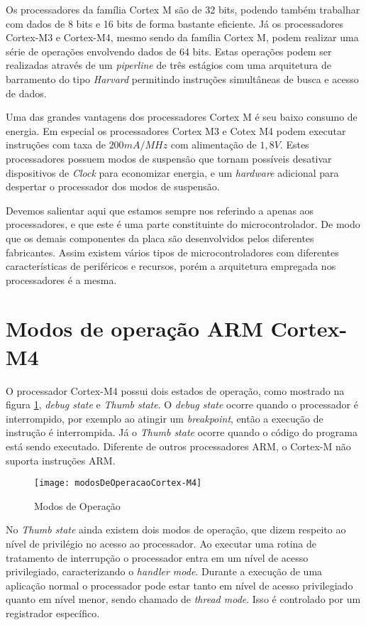 Os processadores da família Cortex M são de 32 bits, podendo também trabalhar com dados de 8 bits e 16 bits de forma bastante eficiente. Já os processadores Cortex-M3  e Cortex-M4, mesmo sendo da família Cortex M, podem realizar uma série de operações envolvendo dados de 64 bits. Estas operações podem ser realizadas através de um \emph{piperline} de três estágios com uma arquitetura de barramento do tipo \emph{Harvard} permitindo instruções simultâneas de busca e acesso de dados.

Uma das grandes vantagens dos processadores Cortex M é seu baixo consumo de energia. Em especial os processadores Cortex M3 e Cotex M4 podem executar instruções com taxa de $200 mA/MHz$ com alimentação de $1,8 V$. Estes processadores possuem modos de suspensão que tornam possíveis desativar dispositivos de \emph{Clock} para economizar energia, e um \emph{hardware} adicional para despertar o processador dos modos de suspensão.

Devemos salientar aqui que estamos sempre nos referindo a apenas aos processadores, e que este é uma parte constituinte do microcontrolador. De modo que os demais componentes da placa são desenvolvidos pelos diferentes fabricantes. Assim existem vários tipos de microcontroladores com diferentes características de periféricos e recursos, porém a arquitetura empregada nos processadores é a mesma.


\section{Modos de operação ARM Cortex-M4}

O processador Cortex-M4 possui dois estados de operação, como mostrado na figura \ref{fig:modosDeOperacao}, \emph{debug state} e \emph{Thumb state}. O \emph{debug state} ocorre quando o processador é interrompido, por exemplo ao atingir um \emph{breakpoint}, então a execução de instrução é interrompida. Já o \emph{Thumb state} ocorre quando o código do programa está sendo executado. Diferente de outros processadores ARM, o Cortex-M não suporta instruções ARM.

\begin{figure}[H]
	\centering
	\texttt{[image: modosDeOperacaoCortex-M4]}
	\caption{Modos de Operação \cite{DATASHEET_TIVA}}
	\label{fig:modosDeOperacao}
\end{figure}

No \emph{Thumb state} ainda existem dois modos de operação, que dizem respeito ao nível de privilégio no acesso ao processador. Ao executar uma rotina de tratamento de interrupção o processador entra em um nível de acesso privilegiado, caracterizando o \emph{handler mode}. Durante a execução de uma aplicação normal o processador pode estar tanto em nível de acesso privilegiado quanto em nível menor, sendo chamado de \emph{thread mode}. Isso é controlado por um registrador específico. 

